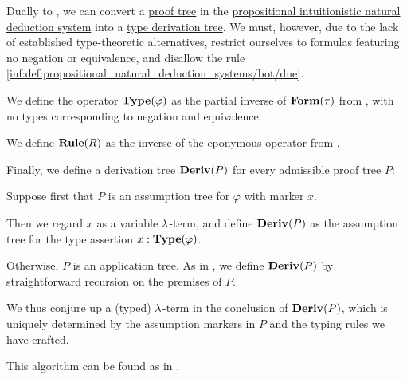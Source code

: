 \begin{algorithm}\label{alg:proof_tree_to_type_derivation}
  Dually to , we can convert a \hyperref[def:natural_deduction_proof_tree]{proof tree} in the \hyperref[def:propositional_natural_deduction_systems]{propositional intuitionistic natural deduction system} into a \hyperref[def:type_derivation_tree]{type derivation tree}. We must, however, due to the lack of established type-theoretic alternatives, restrict ourselves to formulas featuring no negation or equivalence, and disallow the rule \ref{inf:def:propositional_natural_deduction_systems/bot/dne}.

  \begin{thmenum}
     We define the operator \( \op*{Type}(\varphi) \) as the partial inverse of \( \op*{Form}(\tau) \) from , with no types corresponding to negation and equivalence.

     We define \( \op*{Rule}(R) \) as the inverse of the eponymous operator from .

     Finally, we define a derivation tree \( \op*{Deriv}(P) \) for every admissible proof tree \( P \):
    \begin{thmenum}
       Suppose first that \( P \) is an assumption tree for \( \varphi \) with marker \( x \).

      Then we regard \( x \) as a variable \( \mathrm{\lambda} \)-term, and define \( \op*{Deriv}(P) \) as the assumption tree for the type assertion \( x: \op*{Type}(\varphi) \).

       Otherwise, \( P \) is an application tree. As in , we define \( \op*{Deriv}(P) \) by straightforward recursion on the premises of \( P \).

      We thus conjure up a (typed) \( \mathrm{\lambda} \)-term in the conclusion of \( \op*{Deriv}(P) \), which is uniquely determined by the assumption markers in \( P \) and the typing rules we have crafted.
    \end{thmenum}
  \end{thmenum}
\end{algorithm}
\begin{comments}
  \item This algorithm can be found as  in \cite{notebook:code}.
\end{comments}

